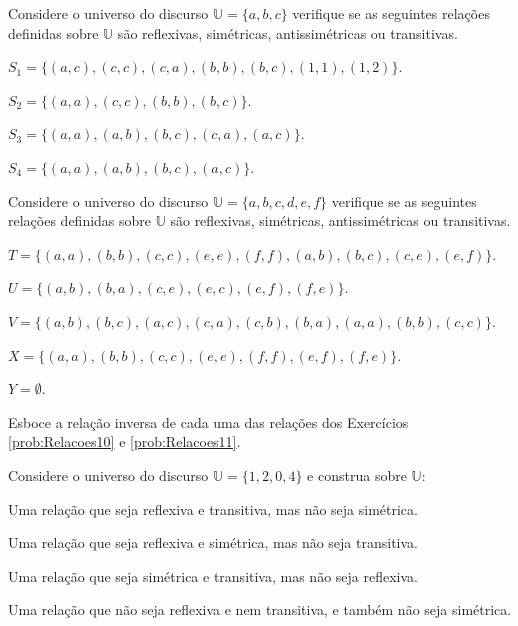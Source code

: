 \begin{questao}\label{prob:Relacoes10}
	Considere o universo do discurso $\mathbb{U} = \{a, b, c\}$ verifique se as seguintes relações  definidas sobre $\mathbb{U}$ são reflexivas, simétricas, antissimétricas ou transitivas.
\end{questao}

\begin{exerList}
	\item $S_1 = \{(a, c), (c, c), (c, a), (b, b), (b, c), (1, 1), (1, 2)\}$.
	\item $S_2 = \{(a, a), (c, c), (b, b), (b, c)\}$.
	\item $S_3 = \{(a,a), (a, b), (b, c), (c, a), (a, c)\}$.
	\item $S_4 = \{(a, a), (a, b), (b, c), (a, c)\}$.
\end{exerList}

\begin{questao}\label{prob:Relacoes11}
	Considere o universo do discurso $\mathbb{U} = \{a, b, c, d, e,f\}$ verifique se as seguintes relações  definidas sobre $\mathbb{U}$ são reflexivas, simétricas, antissimétricas ou transitivas.
\end{questao}

\begin{exerList}
	\item $T = \{(a, a),  (b, b), (c, c), (e, e), (f, f), (a, b), (b, c), (c, e), (e, f)\}$.
	\item $U = \{(a, b),  (b, a), (c, e), (e, c), (e, f), (f, e)\}$.
	\item $V = \{(a, b),  (b, c), (a, c), (c, a), (c, b), (b, a), (a, a), (b, b), (c, c)\}$.
	\item $X = \{(a, a),  (b, b), (c, c), (e, e), (f, f), (e, f), (f, e)\}$.
	\item $Y = \emptyset$.
\end{exerList}

\begin{questao}\label{prob:Relacoes12}
	Esboce a relação inversa de cada uma das relações dos Exercícios \ref{prob:Relacoes10} e \ref{prob:Relacoes11}.
\end{questao}

\begin{questao}\label{prob:Relacoes13}
	Considere o universo do discurso $\mathbb{U} = \{1, 2, 0, 4\}$ e construa sobre $\mathbb{U}$:
\end{questao}

\begin{exerList}
	\item Uma relação que seja reflexiva e transitiva, mas não seja simétrica.
	\item Uma relação que seja reflexiva e simétrica, mas não seja transitiva.
	\item Uma relação que seja simétrica e transitiva, mas não seja reflexiva.
	\item Uma relação que não seja reflexiva e nem  transitiva, e também não seja simétrica.
\end{exerList}

